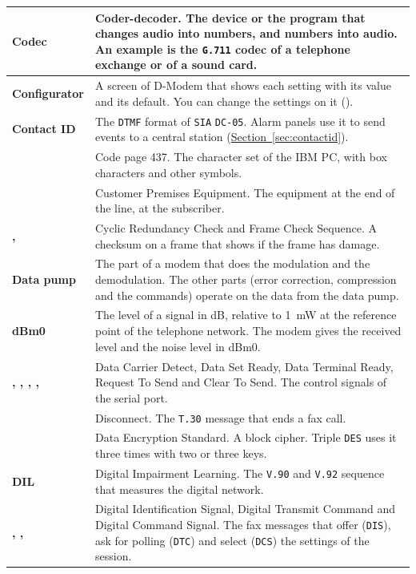 \documentclass[a5paper,10pt]{article}
\makeatletter
\newcommand{\cmd}[1]{\texttt{#1}}
\newcommand{\std}[1]{\texttt{#1}}
\newcommand{\stdb}[1]{\textpdfrender{TextRenderingMode=FillStroke,
  LineWidth=0.25pt}{\texttt{#1}}}
\newcommand{\cmdl}[2][]{\hyperlink{cmd:#1}{\cmd{#2}}}
\let\cmd\@firstofone
\makeatother
\begin{document}
{\begin{longtable}{|>{\raggedright\arraybackslash}p{}|>{\raggedright\arraybackslash}p{}|}
\textbf{Codec} & Coder-decoder.  The device or the program that changes audio into numbers, and numbers into audio.  An example is the \std{G.711} codec of a telephone exchange or of a sound card. \\ \hline
\textbf{Configurator} & A screen of D-Modem that shows each setting with its value and its default.  You can change the settings on it (\cmdl[bangC]{!C}). \\ \hline
\textbf{Contact ID} & The \std{DTMF} format of \std{SIA} \std{DC-05}.  Alarm panels use it to send events to a central station (\hyperref[sec:contactid]{Section~\ref*{sec:contactid}}). \\ \hline
\textbf{\stdb{CP437}} & Code page 437.  The character set of the IBM PC, with box characters and other symbols. \\ \hline
\textbf{\stdb{CPE}} & Customer Premises Equipment.  The equipment at the end of the line, at the subscriber. \\ \hline
\textbf{\stdb{CRC}, \stdb{FCS}} & Cyclic Redundancy Check and Frame Check Sequence.  A checksum on a frame that shows if the frame has damage. \\ \hline
\textbf{Data pump} & The part of a modem that does the modulation and the demodulation.  The other parts (error correction, compression and the commands) operate on the data from the data pump. \\ \hline
\textbf{dBm0} & The level of a signal in dB, relative to 1~mW at the reference point of the telephone network.  The modem gives the received level and the noise level in dBm0. \\ \hline
\textbf{\stdb{DCD}, \stdb{DSR}, \stdb{DTR}, \stdb{RTS}, \stdb{CTS}} & Data Carrier Detect, Data Set Ready, Data Terminal Ready, Request To Send and Clear To Send.  The control signals of the serial port. \\ \hline
\textbf{\stdb{DCN}} & Disconnect.  The \std{T.30} message that ends a fax call. \\ \hline
\textbf{\stdb{DES}} & Data Encryption Standard.  A block cipher.  Triple \std{DES} uses it three times with two or three keys. \\ \hline
\textbf{DIL} & Digital Impairment Learning.  The \std{V.90} and \std{V.92} sequence that measures the digital network. \\ \hline
\textbf{\stdb{DIS}, \stdb{DTC}, \stdb{DCS}} & Digital Identification Signal, Digital Transmit Command and Digital Command Signal.  The fax messages that offer (\std{DIS}), ask for polling (\std{DTC}) and select (\std{DCS}) the settings of the session. \\ \hline

\end{longtable}}
\end{document}
